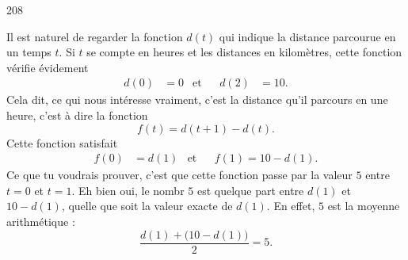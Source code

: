 \begin{corrige}{208}

Il est naturel de regarder la fonction $d(t)$ qui indique la distance parcourue en un temps $t$. Si $t$ se compte en heures et les distances en kilomètres, cette fonction vérifie évidement
\begin{align*}
d(0)&=0&\text{et}&&d(2)&=10.
\end{align*}
Cela dit, ce qui nous intéresse vraiment, c'est la distance qu'il parcours en une heure, c'est à dire la fonction
\[ 
  f(t)=d(t+1)-d(t).
\]
Cette fonction satisfait 
\begin{align*}
f(0)&=d(1)&\text{et}&&f(1)=10-d(1).
\end{align*}
Ce que tu voudrais prouver, c'est que cette fonction passe par la valeur $5$ entre $t=0$ et $t=1$. Eh bien oui, le nombr $5$ est quelque part entre $d(1)$ et $10-d(1)$, quelle que soit la valeur exacte de $d(1)$. En effet, $5$ est la moyenne arithmétique :
\[ 
  \frac{ d(1)+\big(10-d(1)\big) }{ 2 }=5.
\]

\end{corrige}



